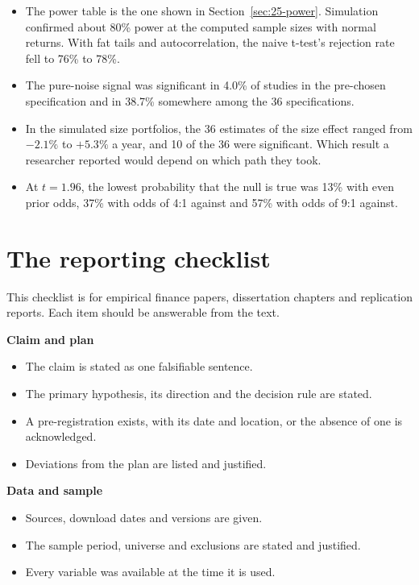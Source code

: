 \begin{itemize}
  \item The power table is the one shown in Section~\ref{sec:25-power}. Simulation confirmed about 80\% power at the computed sample sizes with normal returns. With fat tails and autocorrelation, the naive t-test's rejection rate fell to 76\% to 78\%.
  \item The pure-noise signal was significant in 4.0\% of studies in the pre-chosen specification and in 38.7\% somewhere among the 36 specifications.
  \item In the simulated size portfolios, the 36 estimates of the size effect ranged from $-2.1\%$ to $+5.3\%$ a year, and 10 of the 36 were significant. Which result a researcher reported would depend on which path they took.
  \item At $t = 1.96$, the lowest probability that the null is true was 13\% with even prior odds, 37\% with odds of 4:1 against and 57\% with odds of 9:1 against.
\end{itemize}

\section{The reporting checklist}
\label{sec:25-checklist}

This checklist is for empirical finance papers, dissertation chapters and replication reports. Each item should be answerable from the text.

\textbf{Claim and plan}

\begin{itemize}
  \item[$\square$] The claim is stated as one falsifiable sentence.
  \item[$\square$] The primary hypothesis, its direction and the decision rule are stated.
  \item[$\square$] A pre-registration exists, with its date and location, or the absence of one is acknowledged.
  \item[$\square$] Deviations from the plan are listed and justified.
\end{itemize}

\textbf{Data and sample}

\begin{itemize}
  \item[$\square$] Sources, download dates and versions are given.
  \item[$\square$] The sample period, universe and exclusions are stated and justified.
  \item[$\square$] Every variable was available at the time it is used.
\end{itemize}

